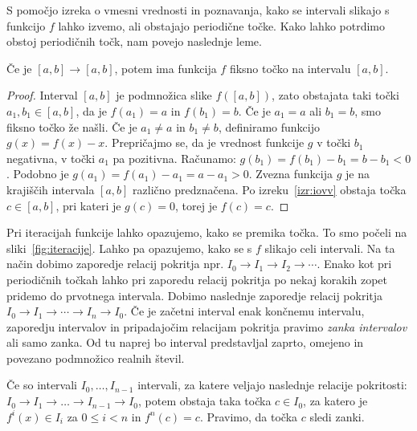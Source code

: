 \documentclass[mat2]{fmfdelo}
\begin{document}
S pomočjo izreka o vmesni vrednosti in poznavanja, kako se intervali slikajo s funkcijo $f$ lahko izvemo, ali obstajajo periodične točke. Kako lahko potrdimo obstoj periodičnih točk, nam povejo naslednje leme.

\begin{lema}\label{lem:1zanka}
Če je $[a, b] \to [a, b]$, potem ima funkcija $f$ fiksno točko na intervalu $[a, b]$.
\end{lema}
\begin{proof}
Interval $[a, b]$ je podmnožica slike $f([a, b])$, zato obstajata taki točki $a_1, b_1 \in [a, b]$, da je $f(a_1)=a$ in $f(b_1)=b$. Če je $a_1 = a$ ali $b_1 = b$, smo fiksno točko že našli. Če je $a_1 \neq a$ in $b_1 \neq b$, definiramo funkcijo $g(x) = f(x) - x$. Prepričajmo se, da je vrednost funkcije $g$ v točki $b_1$ negativna, v točki $a_1$ pa pozitivna. Računamo:
$g(b_1) = f(b_1) - b_1 = b - b_1 < 0$. Podobno je
$g(a_1) = f(a_1) - a_1 = a - a_1 > 0$.
Zvezna funkcija $g$ je na krajiščih intervala $[a, b]$ različno predznačena. Po izreku~\ref{izr:iovv} obstaja točka $c \in [a, b]$, pri kateri je $g(c)=0$, torej je $f(c) = c$.
\end{proof}
Pri iteracijah funkcije lahko opazujemo, kako se premika točka. To smo počeli na sliki~\ref{fig:iteracije}. Lahko pa opazujemo, kako se s $f$ slikajo celi intervali. Na ta način dobimo zaporedje relacij pokritja npr. $I_0 \to I_1 \to I_2 \to \cdots $. Enako kot pri periodičnih točkah lahko pri zaporedu relacij pokritja po nekaj korakih zopet pridemo do prvotnega intervala. Dobimo naslednje zaporedje relacij pokritja $I_0 \to I_1 \to \cdots \to I_n \to I_0$. Če je začetni interval enak končnemu intervalu, zaporedju intervalov in pripadajočim relacijam pokritja pravimo \emph{zanka intervalov} ali samo zanka. Od tu naprej bo interval predstavljal zaprto, omejeno in povezano podmnožico realnih števil.

\begin{lema}\label{lem:zanka}
Če so intervali $I_0, \dots, I_{n-1}$ intervali, za katere veljajo naslednje relacije pokritosti: $I_0 \to I_1 \to \dots \to I_{n-1} \to I_0$, potem obstaja taka točka $c \in I_0$, za katero je $f^{i}(x) \in I_i$ za $0 \leq i < n$ in $f^n(c)=c$. Pravimo, da točka $c$ sledi zanki.
\end{lema}
\end{document}
